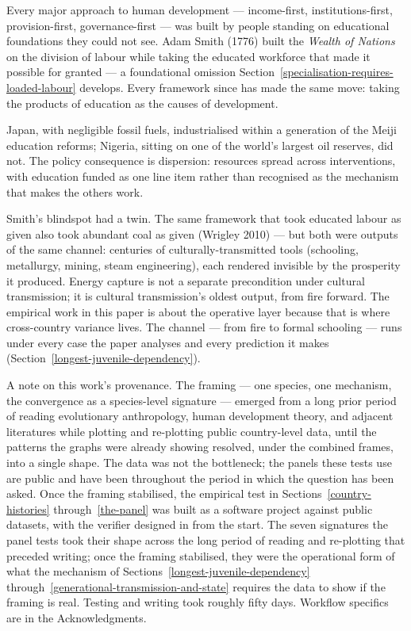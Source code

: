 \documentclass[12pt,letterpaper]{article}
\begin{document}
Every major approach to human development --- income-first,
institutions-first, provision-first, governance-first --- was built by
people standing on educational foundations they could not see. Adam
Smith (1776) built the \emph{Wealth of Nations} on the division of
labour while taking the educated workforce that made it possible for
granted --- a foundational omission
Section~\ref{specialisation-requires-loaded-labour} develops. Every
framework since has made the same move: taking the products of
education as the causes of development.

Japan, with negligible fossil fuels, industrialised within a
generation of the Meiji education reforms; Nigeria, sitting on one of
the world's largest oil reserves, did not. The policy consequence is
dispersion: resources spread across interventions, with education
funded as one line item rather than recognised as the mechanism that
makes the others work.

Smith's blindspot had a twin. The same framework that took educated
labour as given also took abundant coal as given (Wrigley 2010) ---
but both were outputs of the same channel: centuries of
culturally-transmitted tools (schooling, metallurgy, mining, steam
engineering), each rendered invisible by the prosperity it produced. Energy capture is
not a separate precondition under cultural transmission; it is
cultural transmission's oldest output, from fire forward. The
empirical work in this paper is about the operative layer because
that is where cross-country variance lives. The channel --- from fire
to formal schooling --- runs under every case the paper analyses and
every prediction it makes (Section~\ref{longest-juvenile-dependency}).

A note on this work's provenance. The framing --- one species, one
mechanism, the convergence as a species-level signature --- emerged
from a long prior period of reading evolutionary anthropology, human
development theory, and adjacent literatures while plotting and
re-plotting public country-level data, until the patterns the graphs
were already showing resolved, under the combined frames, into a
single shape. The data was not the bottleneck; the panels these
tests use are public and have been throughout the period in which
the question has been asked. Once the framing
stabilised, the empirical test in Sections~\ref{country-histories}
through~\ref{the-panel} was built as a software project against
public datasets, with the verifier designed in from the start. The seven signatures the panel tests took their shape across the
long period of reading and re-plotting that preceded writing;
once the framing stabilised, they were the operational form of
what the mechanism of Sections~\ref{longest-juvenile-dependency}
through~\ref{generational-transmission-and-state} requires the
data to show if the framing is real. Testing and writing
took roughly fifty days. Workflow specifics are in the Acknowledgments.
\end{document}

